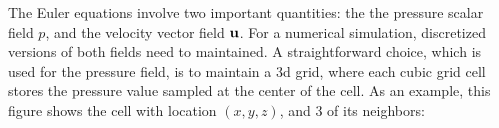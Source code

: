 The Euler equations involve two important quantities: the the pressure scalar field $p$, and the velocity vector field $\textbf{u}$. For a numerical simulation, discretized versions of both fields need to maintained. A straightforward choice, which is used for the pressure field, is to maintain a 3d grid, where each cubic grid cell stores the pressure value sampled at the center of the cell. As an example, this figure shows the cell with location $(x,y,z)$, and 3 of its neighbors:


\begin{figure}[!h]
    \centering
    

\end{figure}
